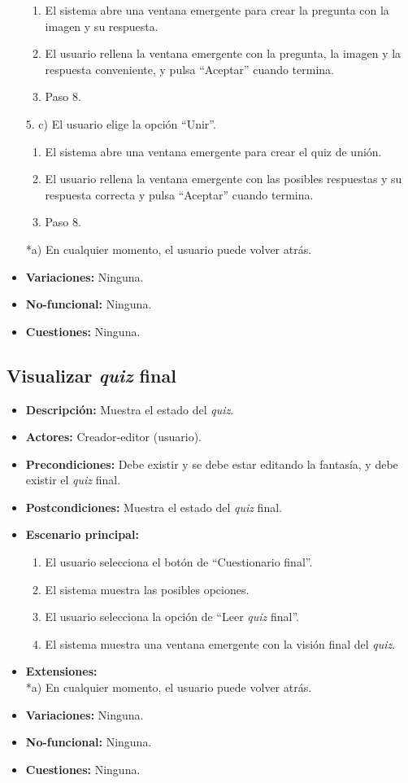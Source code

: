 \begin{itemize}
\begin{enumerate}
		\item El sistema abre una ventana emergente para crear la pregunta con la imagen y su respuesta.
		\item El usuario rellena la ventana emergente con la pregunta, la imagen y la respuesta conveniente, y pulsa ``Aceptar'' cuando termina.
		\item Paso 8.
	\end{enumerate}
	5. c) El usuario elige la opción ``Unir''.
	\begin{enumerate}
		\item El sistema abre una ventana emergente para crear el quiz de unión.
		\item El usuario rellena la ventana emergente con las posibles respuestas y su respuesta correcta y pulsa ``Aceptar'' cuando termina.
		\item Paso 8.
	\end{enumerate}
	*a) En cualquier momento, el usuario puede volver atrás.
	\item \textbf{Variaciones:} Ninguna.
	\item \textbf{No-funcional:} Ninguna.
	\item \textbf{Cuestiones:} Ninguna.
\end{itemize}

\subsection{Visualizar \textit{quiz} final}
\begin{itemize}
	\item \textbf{Descripción:} Muestra el estado del \textit{quiz}.
	\item \textbf{Actores:} Creador-editor (usuario).
	\item \textbf{Precondiciones:} Debe existir y se debe estar editando la fantasía, y debe existir el \textit{quiz} final.
	\item \textbf{Postcondiciones:} Muestra el estado del \textit{quiz} final.
	\item \textbf{Escenario principal:}
	\begin{enumerate}
		\item El usuario selecciona el botón de ``Cuestionario final''.
		\item El sistema muestra las posibles opciones.
		\item El usuario selecciona la opción de ``Leer \textit{quiz} final''.
		\item El sistema muestra una ventana emergente con la visión final del \textit{quiz}.
	\end{enumerate}
	\item \textbf{Extensiones:} \\ *a) En cualquier momento, el usuario puede volver atrás.
	\item \textbf{Variaciones:} Ninguna.
	\item \textbf{No-funcional:} Ninguna.
	\item \textbf{Cuestiones:} Ninguna.
\end{itemize}

